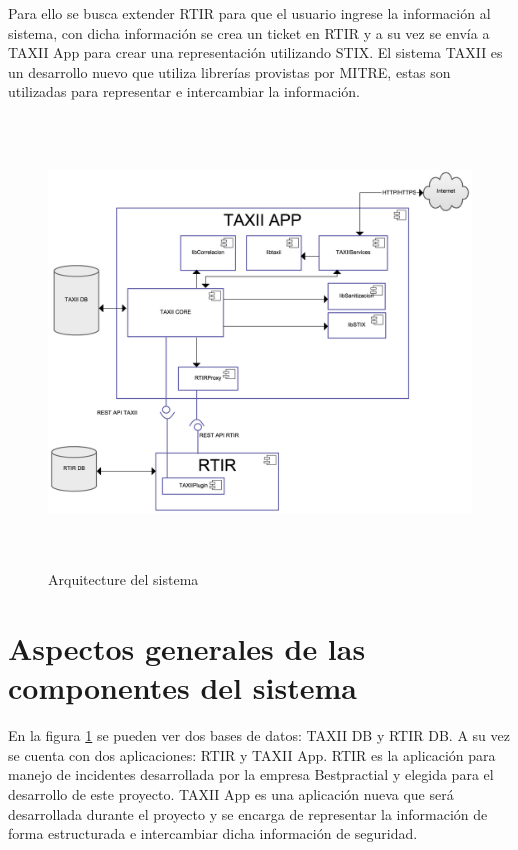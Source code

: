 	\bigskip
	
	Para ello se busca extender RTIR para que el usuario ingrese la información al sistema, con
		dicha información se crea un ticket en RTIR y a su vez se envía a TAXII App para crear una representación utilizando
		STIX. El sistema TAXII es un desarrollo nuevo que utiliza librerías provistas por MITRE, estas son utilizadas para
		representar e intercambiar la información.
	
	
	\bigskip
	
	\begin{figure}[ht!]
		\centering
		\includegraphics[width=5.7638in,height=4.6846in]{Diseno21-img/Diseno21-img003.png} 
		\caption{Arquitecture del sistema}	
		\label{fig.arquitecturasistema}
	\end{figure}
	\bigskip
	
	
	\section{Aspectos generales de las componentes del sistema}
	
	

	En la figura \ref{fig.arquitecturasistema} se pueden ver dos bases de datos: TAXII DB y RTIR DB. A su vez se cuenta con dos
		aplicaciones: RTIR y TAXII App. RTIR es la aplicación para manejo de incidentes desarrollada por la empresa
		Bestpractial \cite{bp} y elegida para el desarrollo de este proyecto. TAXII App es una aplicación nueva que será
		desarrollada durante el proyecto y se encarga de representar la información de forma estructurada e intercambiar dicha
		información de seguridad.
    \bigskip
	
